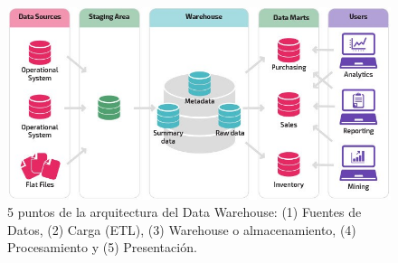 \documentclass[12pt, a4paper, twoside]{article}
\begin{document}
	
	\begin{figure}[h!]
		\centering %
		\includegraphics[width=1\textwidth]{image/Arquitectura.jpg}
		\caption{5 puntos de la arquitectura del Data Warehouse: (1) Fuentes de Datos, (2) Carga (ETL), (3) Warehouse o almacenamiento, (4) Procesamiento y (5) Presentación.} %
		\label{fig:Arqui}
	\end{figure}
	
\end{document}
